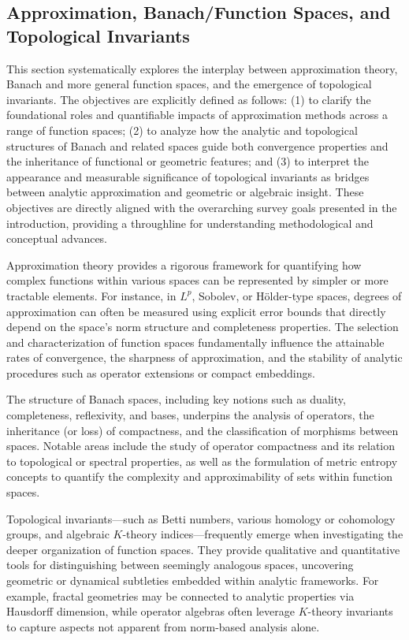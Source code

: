 \documentclass[sigconf]{acmart}
\begin{document}
\subsection{Approximation, Banach/Function Spaces, and Topological Invariants}

This section systematically explores the interplay between approximation theory, Banach and more general function spaces, and the emergence of topological invariants. The objectives are explicitly defined as follows: (1) to clarify the foundational roles and quantifiable impacts of approximation methods across a range of function spaces; (2) to analyze how the analytic and topological structures of Banach and related spaces guide both convergence properties and the inheritance of functional or geometric features; and (3) to interpret the appearance and measurable significance of topological invariants as bridges between analytic approximation and geometric or algebraic insight. These objectives are directly aligned with the overarching survey goals presented in the introduction, providing a throughline for understanding methodological and conceptual advances.

Approximation theory provides a rigorous framework for quantifying how complex functions within various spaces can be represented by simpler or more tractable elements. For instance, in $L^p$, Sobolev, or Hölder-type spaces, degrees of approximation can often be measured using explicit error bounds that directly depend on the space’s norm structure and completeness properties. The selection and characterization of function spaces fundamentally influence the attainable rates of convergence, the sharpness of approximation, and the stability of analytic procedures such as operator extensions or compact embeddings.

The structure of Banach spaces, including key notions such as duality, completeness, reflexivity, and bases, underpins the analysis of operators, the inheritance (or loss) of compactness, and the classification of morphisms between spaces. Notable areas include the study of operator compactness and its relation to topological or spectral properties, as well as the formulation of metric entropy concepts to quantify the complexity and approximability of sets within function spaces.

Topological invariants—such as Betti numbers, various homology or cohomology groups, and algebraic $K$-theory indices—frequently emerge when investigating the deeper organization of function spaces. They provide qualitative and quantitative tools for distinguishing between seemingly analogous spaces, uncovering geometric or dynamical subtleties embedded within analytic frameworks. For example, fractal geometries may be connected to analytic properties via Hausdorff dimension, while operator algebras often leverage $K$-theory invariants to capture aspects not apparent from norm-based analysis alone.
\end{document}
